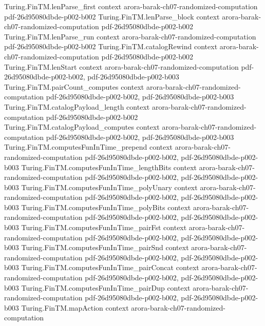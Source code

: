 \begin{theorem}
\proofstep
  {Turing.FinTM.lenParse_first}
  {context}
  {arora-barak-ch07-randomized-computation}
  {pdf-26d95080dbde-p002-b002}
\proofstep
  {Turing.FinTM.lenParse_block}
  {context}
  {arora-barak-ch07-randomized-computation}
  {pdf-26d95080dbde-p002-b002}
\proofstep
  {Turing.FinTM.lenParse_run}
  {context}
  {arora-barak-ch07-randomized-computation}
  {pdf-26d95080dbde-p002-b002}
\proofstep
  {Turing.FinTM.catalogRewind}
  {context}
  {arora-barak-ch07-randomized-computation}
  {pdf-26d95080dbde-p002-b002}
\proofstep
  {Turing.FinTM.lenStart}
  {context}
  {arora-barak-ch07-randomized-computation}
  {pdf-26d95080dbde-p002-b002,
    pdf-26d95080dbde-p002-b003}
\proofstep
  {Turing.FinTM.pairCount_computes}
  {context}
  {arora-barak-ch07-randomized-computation}
  {pdf-26d95080dbde-p002-b002,
    pdf-26d95080dbde-p002-b003}
\proofstep
  {Turing.FinTM.catalogPayload_length}
  {context}
  {arora-barak-ch07-randomized-computation}
  {pdf-26d95080dbde-p002-b002}
\proofstep
  {Turing.FinTM.catalogPayload_computes}
  {context}
  {arora-barak-ch07-randomized-computation}
  {pdf-26d95080dbde-p002-b002,
    pdf-26d95080dbde-p002-b003}
\proofstep
  {Turing.FinTM.computesFunInTime_prepend}
  {context}
  {arora-barak-ch07-randomized-computation}
  {pdf-26d95080dbde-p002-b002,
    pdf-26d95080dbde-p002-b003}
\proofstep
  {Turing.FinTM.computesFunInTime_lengthBits}
  {context}
  {arora-barak-ch07-randomized-computation}
  {pdf-26d95080dbde-p002-b002,
    pdf-26d95080dbde-p002-b003}
\proofstep
  {Turing.FinTM.computesFunInTime_polyUnary}
  {context}
  {arora-barak-ch07-randomized-computation}
  {pdf-26d95080dbde-p002-b002,
    pdf-26d95080dbde-p002-b003}
\proofstep
  {Turing.FinTM.computesFunInTime_polyBits}
  {context}
  {arora-barak-ch07-randomized-computation}
  {pdf-26d95080dbde-p002-b002,
    pdf-26d95080dbde-p002-b003}
\proofstep
  {Turing.FinTM.computesFunInTime_pairFst}
  {context}
  {arora-barak-ch07-randomized-computation}
  {pdf-26d95080dbde-p002-b002,
    pdf-26d95080dbde-p002-b003}
\proofstep
  {Turing.FinTM.computesFunInTime_pairSnd}
  {context}
  {arora-barak-ch07-randomized-computation}
  {pdf-26d95080dbde-p002-b002,
    pdf-26d95080dbde-p002-b003}
\proofstep
  {Turing.FinTM.computesFunInTime_pairConcat}
  {context}
  {arora-barak-ch07-randomized-computation}
  {pdf-26d95080dbde-p002-b002,
    pdf-26d95080dbde-p002-b003}
\proofstep
  {Turing.FinTM.computesFunInTime_pairDup}
  {context}
  {arora-barak-ch07-randomized-computation}
  {pdf-26d95080dbde-p002-b002,
    pdf-26d95080dbde-p002-b003}
\proofstep
  {Turing.FinTM.mapAction}
  {context}
  {arora-barak-ch07-randomized-computation}

\end{theorem}
